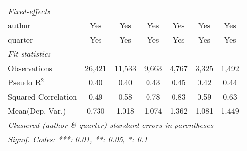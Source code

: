 \begin{tabular}{lcccccc}
   \emph{Fixed-effects}\\
   author                                                     & Yes            & Yes            & Yes            & Yes           & Yes           & Yes\\  
   quarter                                                    & Yes            & Yes            & Yes            & Yes           & Yes           & Yes\\  
   \midrule
   \emph{Fit statistics}\\
   Observations                                               & 26,421         & 11,533         & 9,663          & 4,767         & 3,325         & 1,492\\  
   Pseudo R$^2$                                               & 0.40           & 0.40           & 0.43           & 0.45          & 0.42          & 0.44\\  
   Squared Correlation                                        & 0.49           & 0.58           & 0.78           & 0.83          & 0.59          & 0.63\\  
Mean(Dep. Var.) & 0.730 & 1.018 & 1.074 & 1.362 & 1.081 & 1.449 \\
   \midrule \midrule
   \multicolumn{7}{l}{\emph{Clustered (author \& quarter) standard-errors in parentheses}}\\
   \multicolumn{7}{l}{\emph{Signif. Codes: ***: 0.01, **: 0.05, *: 0.1}}\\
\end{tabular}
\par\endgroup
